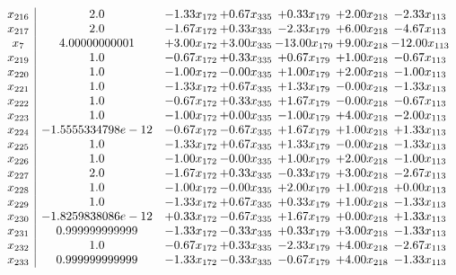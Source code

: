 \documentclass[8pt]{article}
\begin{document}
\[\begin{array}{c| c c@{\hskip 2pt} c@{\hskip 2pt} c@{\hskip 2pt} c@{\hskip 2pt} c@{\hskip 2pt} }
 x_{216}   &  2.0 & -1.33 x_{172} & +  0.67 x_{335} & +  0.33 x_{179} & +  2.00 x_{218} & -2.33 x_{113}\\
 x_{217}   &  2.0 & -1.67 x_{172} & +  0.33 x_{335} & -2.33 x_{179} & +  6.00 x_{218} & -4.67 x_{113}\\
 x_{7}   &  4.00000000001 & +  3.00 x_{172} & +  3.00 x_{335} & -13.00 x_{179} & +  9.00 x_{218} & -12.00 x_{113}\\
 x_{219}   &  1.0 & -0.67 x_{172} & +  0.33 x_{335} & +  0.67 x_{179} & +  1.00 x_{218} & -0.67 x_{113}\\
 x_{220}   &  1.0 & -1.00 x_{172} & -0.00 x_{335} & +  1.00 x_{179} & +  2.00 x_{218} & -1.00 x_{113}\\
 x_{221}   &  1.0 & -1.33 x_{172} & +  0.67 x_{335} & +  1.33 x_{179} & -0.00 x_{218} & -1.33 x_{113}\\
 x_{222}   &  1.0 & -0.67 x_{172} & +  0.33 x_{335} & +  1.67 x_{179} & -0.00 x_{218} & -0.67 x_{113}\\
 x_{223}   &  1.0 & -1.00 x_{172} & +  0.00 x_{335} & -1.00 x_{179} & +  4.00 x_{218} & -2.00 x_{113}\\
 x_{224}   &  -1.5555334798e-12 & -0.67 x_{172} & -0.67 x_{335} & +  1.67 x_{179} & +  1.00 x_{218} & +  1.33 x_{113}\\
 x_{225}   &  1.0 & -1.33 x_{172} & +  0.67 x_{335} & +  1.33 x_{179} & -0.00 x_{218} & -1.33 x_{113}\\
 x_{226}   &  1.0 & -1.00 x_{172} & -0.00 x_{335} & +  1.00 x_{179} & +  2.00 x_{218} & -1.00 x_{113}\\
 x_{227}   &  2.0 & -1.67 x_{172} & +  0.33 x_{335} & -0.33 x_{179} & +  3.00 x_{218} & -2.67 x_{113}\\
 x_{228}   &  1.0 & -1.00 x_{172} & -0.00 x_{335} & +  2.00 x_{179} & +  1.00 x_{218} & +  0.00 x_{113}\\
 x_{229}   &  1.0 & -1.33 x_{172} & +  0.67 x_{335} & +  0.33 x_{179} & +  1.00 x_{218} & -1.33 x_{113}\\
 x_{230}   &  -1.8259838086e-12 & +  0.33 x_{172} & -0.67 x_{335} & +  1.67 x_{179} & +  0.00 x_{218} & +  1.33 x_{113}\\
 x_{231}   &  0.999999999999 & -1.33 x_{172} & -0.33 x_{335} & +  0.33 x_{179} & +  3.00 x_{218} & -1.33 x_{113}\\
 x_{232}   &  1.0 & -0.67 x_{172} & +  0.33 x_{335} & -2.33 x_{179} & +  4.00 x_{218} & -2.67 x_{113}\\
 x_{233}   &  0.999999999999 & -1.33 x_{172} & -0.33 x_{335} & -0.67 x_{179} & +  4.00 x_{218} & -1.33 x_{113}\\

\end{array}\]
\end{document}
